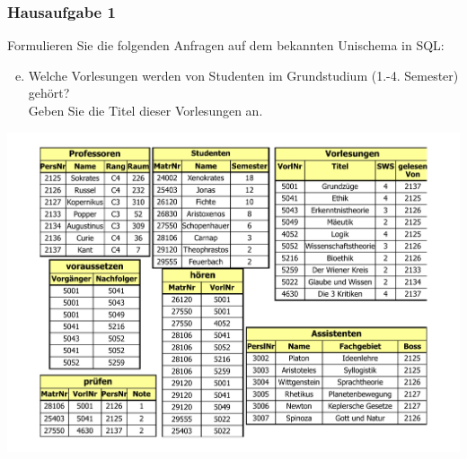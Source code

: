 \begin{frame}[fragile]
	\frametitle{Hausaufgabe 1}
	\vspace{0.5cm}

	\begin{multicols}{2}
		Formulieren Sie die folgenden Anfragen auf dem bekannten Unischema in SQL:
		\begin{enumerate}[a)]
			\setcounter{enumi}{4}
			\item Welche Vorlesungen werden von Studenten im Grundstudium (1.-4. Semester) gehört? \\
			      Geben Sie die Titel dieser Vorlesungen an.
		\end{enumerate}
		\vfill\columnbreak

		\begin{center}
			\includegraphics[height=.6\paperheight]{../img/uni.pdf}
		\end{center}
	\end{multicols}
\end{frame}

